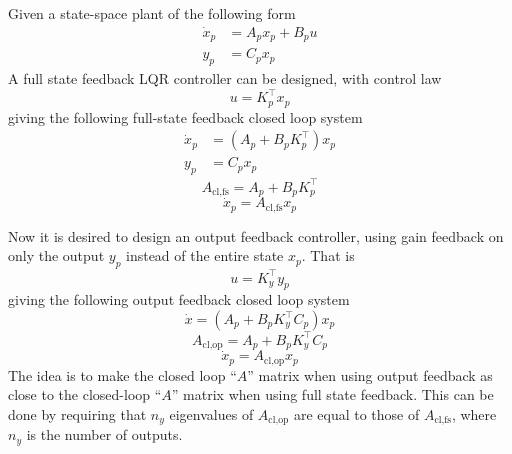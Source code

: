 Given a state-space plant of the following form
\begin{align*}
  \dot{x}_{p}&=A_{p}x_{p}+B_{p}u \\
  y_{p}&=C_{p}x_{p}
\end{align*}
A full state feedback LQR controller can be designed, with control law
\begin{equation*}
  u=K_{p}^{\top}x_{p}
\end{equation*}
giving the following full-state feedback closed loop system
\begin{align*}
  \dot{x}_{p}&=(A_{p}+B_{p}K_{p}^{\top})x_{p} \\
  y_{p}&=C_{p}x_{p}
\end{align*}
\begin{equation*}
  A_{\text{cl,fs}}=A_{p}+B_{p}K_{p}^{\top}
\end{equation*}
\begin{equation*}
  \dot{x}_{p}=A_{\text{cl,fs}}x_{p}
\end{equation*}

Now it is desired to design an output feedback controller, using gain feedback on only the output $y_{p}$ instead of the entire state $x_{p}$.
That is
\begin{equation*}
  u=K_{y}^{\top}y_{p}
\end{equation*}
giving the following output feedback closed loop system
\begin{equation*}
  \dot{x}=(A_{p}+B_{p}K_{y}^{\top}C_{p})x_{p}
\end{equation*}
\begin{equation*}
  A_{\text{cl,op}}=A_{p}+B_{p}K_{y}^{\top}C_{p}
\end{equation*}
\begin{equation*}
  \dot{x}_{p}=A_{\text{cl,op}}x_{p}
\end{equation*}
The idea is to make the closed loop ``$A$'' matrix when using output feedback as close to the closed-loop ``$A$'' matrix when using full state feedback.
This can be done by requiring that $n_{y}$ eigenvalues of $A_{\text{cl,op}}$ are equal to those of $A_{\text{cl,fs}}$, where $n_{y}$ is the number of outputs.

